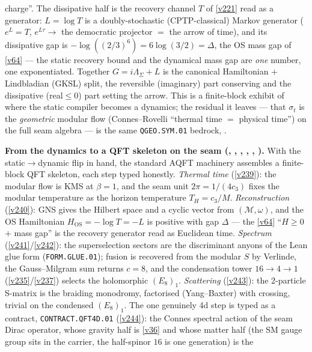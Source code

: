 \documentclass[11pt,a4paper]{article}
\begin{document}
\begin{keybox}
charge''. The dissipative half is the recovery channel $T$ of \vref{v221} read as a generator:
$L=\log T$ is a doubly-stochastic (CPTP-classical) Markov generator ($e^{L}=T$, $e^{L\tau}\to$ the
democratic projector $=$ the arrow of time), and its dissipative gap is $-\log((2/3)^6)=6\log(3/2)=
\Delta$, the OS mass gap of \vref{v64} --- the static recovery bound and the dynamical mass gap are
\emph{one} number, one exponentiated. Together $G=i\Lambda_\Sigma+L$ is the canonical Hamiltonian
$+$ Lindbladian (GKSL) split, the reversible (imaginary) part conserving and the dissipative
(real$\le0$) part setting the arrow. This is a finite-block exhibit of where the static compiler
becomes a dynamics; the residual it leaves --- that $\sigma_t$ is the \emph{geometric} modular flow
(Connes--Rovelli ``thermal time $=$ physical time'') on the full seam algebra --- is the same
\texttt{QGEO.SYM.01} bedrock, \mO.
\par\smallskip\noindent\textbf{From the dynamics to a QFT skeleton on the seam
(, ,
, ,
, ).}
With the static$\to$dynamic flip in hand, the standard AQFT machinery assembles a
finite-block QFT skeleton, each step typed honestly. \emph{Thermal time}
(\vref{v239}): the modular flow is KMS at $\beta=1$, and the seam unit
$2\pi=1/(4c_3)$ fixes the modular temperature as the horizon temperature
$T_H=c_3/M$. \emph{Reconstruction} (\vref{v240}): GNS gives the Hilbert space and a
cyclic vector from $(\mathcal M,\omega)$, and the OS Hamiltonian
$H_{\mathrm{OS}}=-\log T=-L$ is positive with gap $\Delta$ --- the \vref{v64}
``$H\ge0$ $+$ mass gap'' is the recovery generator read as Euclidean time.
\emph{Spectrum} (\vref{v241}/\vref{v242}): the superselection sectors are the
discriminant anyons of the Lean glue form (\texttt{FORM.GLUE.01}); fusion is
recovered from the modular $S$ by Verlinde, the Gauss--Milgram sum returns $c=8$,
and the condensation tower $16\to4\to1$ (\vref{v235}/\vref{v237}) selects the
holomorphic $(E_8)_1$. \emph{Scattering} (\vref{v243}): the $2$-particle S-matrix is
the braiding monodromy, factorised (Yang--Baxter) with crossing, trivial on the
condensed $(E_8)_1$. The one genuinely 4d step is typed as a contract,
\texttt{CONTRACT.QFT4D.01} (\vref{v244}): the Connes spectral action of the seam
Dirac operator, whose gravity half is \vref{v36} and whose matter half (the SM
gauge group sits in the carrier, the half-spinor $16$ is one generation) is the

\end{keybox}
\end{document}
